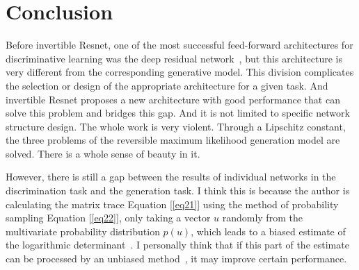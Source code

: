 \documentclass[final]{cvpr}
\begin{document}
\section{Conclusion}
Before invertible Resnet, one of the most successful feed-forward architectures for discriminative learning was the deep residual network~\cite{he2016deep}, but this architecture is very different from the corresponding generative model. This division complicates the selection or design of the appropriate architecture for a given task. And invertible Resnet proposes a new architecture with good performance that can solve this problem and bridges this gap. And it is not limited to specific network structure design. The whole work is very violent. Through a Lipschitz constant, the three problems of the reversible maximum likelihood generation model are solved. There is a whole sense of beauty in it.

However, there is still a gap between the results of individual networks in the discrimination task and the generation task. I think this is because the author is calculating the matrix trace Equation [\ref{eq21}] using the method of probability sampling Equation [\ref{eq22}], only taking a vector $u$ randomly from the multivariate probability distribution $p( u)$, which leads to a biased estimate of the logarithmic determinant~\cite{han2018stochastic}. I personally think that if this part of the estimate can be processed by an unbiased method~\cite{anil2019sorting}, it may improve certain performance.







{\small



}
\end{document}
